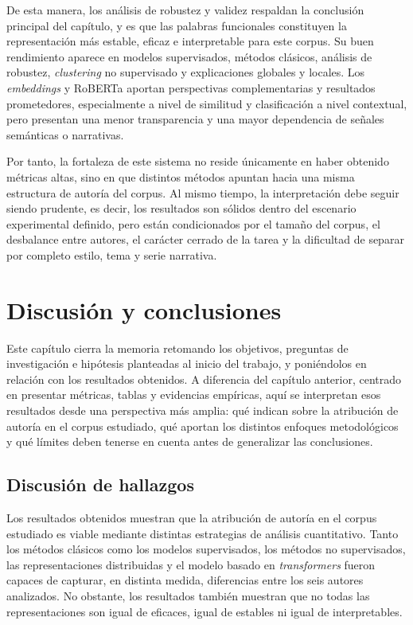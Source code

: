 \documentclass[IB]{TFUOC}%
\begin{document}
De esta manera, los análisis de robustez y validez respaldan la conclusión principal del capítulo, y es que las palabras funcionales constituyen la representación más estable, eficaz e interpretable para este corpus. Su buen rendimiento aparece en modelos supervisados, métodos clásicos, análisis de robustez, \textit{clustering} no supervisado y explicaciones globales y locales. Los \textit{embeddings} y RoBERTa aportan perspectivas complementarias y resultados prometedores, especialmente a nivel de similitud y clasificación a nivel contextual, pero presentan una menor transparencia y una mayor dependencia de señales semánticas o narrativas.

Por tanto, la fortaleza de este sistema no reside únicamente en haber obtenido métricas altas, sino en que distintos métodos apuntan hacia una misma estructura de autoría del corpus. Al mismo tiempo, la interpretación debe seguir siendo prudente, es decir, los resultados son sólidos dentro del escenario experimental definido, pero están condicionados por el tamaño del corpus, el desbalance entre autores, el carácter cerrado de la tarea y la dificultad de separar por completo estilo, tema y serie narrativa.

\chapter{Discusión y conclusiones}

Este capítulo cierra la memoria retomando los objetivos, preguntas de investigación e hipótesis planteadas al inicio del trabajo, y poniéndolos en relación con los resultados obtenidos. A diferencia del capítulo anterior, centrado en presentar métricas, tablas y evidencias empíricas, aquí se interpretan esos resultados desde una perspectiva más amplia: qué indican sobre la atribución de autoría en el corpus estudiado, qué aportan los distintos enfoques metodológicos y qué límites deben tenerse en cuenta antes de generalizar las conclusiones.

\section{Discusión de hallazgos}

Los resultados obtenidos muestran que la atribución de autoría en el corpus estudiado es viable mediante distintas estrategias de análisis cuantitativo. Tanto los métodos clásicos como los modelos supervisados, los métodos no supervisados, las representaciones distribuidas y el modelo basado en \textit{transformers} fueron capaces de capturar, en distinta medida, diferencias entre los seis autores analizados. No obstante, los resultados también muestran que no todas las representaciones son igual de eficaces, igual de estables ni igual de interpretables.
\end{document}

